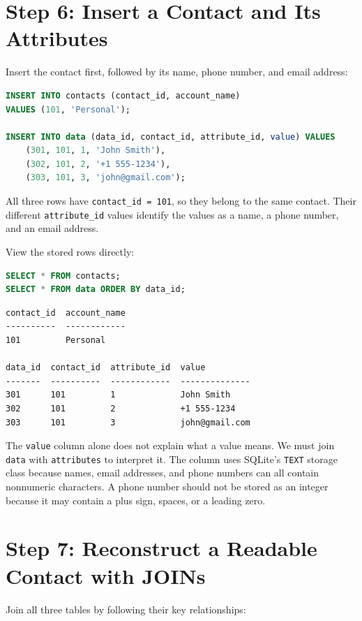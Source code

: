 \documentclass[11pt]{article}
\begin{document}
\section*{Step 6: Insert a Contact and Its Attributes}

Insert the contact first, followed by its name, phone number, and email address:

\begin{lstlisting}[language=SQL]
INSERT INTO contacts (contact_id, account_name)
VALUES (101, 'Personal');

INSERT INTO data (data_id, contact_id, attribute_id, value) VALUES
    (301, 101, 1, 'John Smith'),
    (302, 101, 2, '+1 555-1234'),
    (303, 101, 3, 'john@gmail.com');
\end{lstlisting}

All three rows have \texttt{contact\_id = 101}, so they belong to the same
contact. Their different \texttt{attribute\_id} values identify the values as
a name, a phone number, and an email address.

View the stored rows directly:

\begin{lstlisting}[language=SQL]
SELECT * FROM contacts;
SELECT * FROM data ORDER BY data_id;
\end{lstlisting}

\begin{verbatim}
contact_id  account_name
----------  ------------
101         Personal

data_id  contact_id  attribute_id  value
-------  ----------  ------------  --------------
301      101         1             John Smith
302      101         2             +1 555-1234
303      101         3             john@gmail.com
\end{verbatim}

The \texttt{value} column alone does not explain what a value means. We must
join \texttt{data} with \texttt{attributes} to interpret it. The column
uses SQLite's \texttt{TEXT} storage class because names, email addresses, and
phone numbers can all contain nonnumeric characters. A phone number should not
be stored as an integer because it may contain a plus sign, spaces, or a leading
zero.

\section*{Step 7: Reconstruct a Readable Contact with JOINs}

Join all three tables by following their key relationships:
\end{document}

